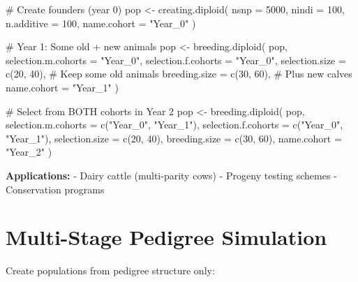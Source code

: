 \documentclass[
  letterpaper,
]{book}
\newenvironment{Shaded}{\begin{snugshade}}{\end{snugshade}}
\newcommand{\AttributeTok}[1]{\textcolor[rgb]{0.40,0.45,0.13}{#1}}
\newcommand{\CommentTok}[1]{\textcolor[rgb]{0.37,0.37,0.37}{#1}}
\newcommand{\DecValTok}[1]{\textcolor[rgb]{0.68,0.00,0.00}{#1}}
\newcommand{\FunctionTok}[1]{\textcolor[rgb]{0.28,0.35,0.67}{#1}}
\newcommand{\NormalTok}[1]{\textcolor[rgb]{0.00,0.23,0.31}{#1}}
\newcommand{\OtherTok}[1]{\textcolor[rgb]{0.00,0.23,0.31}{#1}}
\newcommand{\StringTok}[1]{\textcolor[rgb]{0.13,0.47,0.30}{#1}}
\begin{document}
\begin{Shaded}
\begin{Highlighting}[]
\CommentTok{\# Create founders (year 0)}
\NormalTok{pop }\OtherTok{\textless{}{-}} \FunctionTok{creating.diploid}\NormalTok{(}
  \AttributeTok{nsnp =} \DecValTok{5000}\NormalTok{, }\AttributeTok{nindi =} \DecValTok{100}\NormalTok{,}
  \AttributeTok{n.additive =} \DecValTok{100}\NormalTok{,}
  \AttributeTok{name.cohort =} \StringTok{"Year\_0"}
\NormalTok{)}

\CommentTok{\# Year 1: Some old + new animals}
\NormalTok{pop }\OtherTok{\textless{}{-}} \FunctionTok{breeding.diploid}\NormalTok{(}
\NormalTok{  pop,}
  \AttributeTok{selection.m.cohorts =} \StringTok{"Year\_0"}\NormalTok{,}
  \AttributeTok{selection.f.cohorts =} \StringTok{"Year\_0"}\NormalTok{,}
  \AttributeTok{selection.size =} \FunctionTok{c}\NormalTok{(}\DecValTok{20}\NormalTok{, }\DecValTok{40}\NormalTok{),    }\CommentTok{\# Keep some old animals}
  \AttributeTok{breeding.size =} \FunctionTok{c}\NormalTok{(}\DecValTok{30}\NormalTok{, }\DecValTok{60}\NormalTok{),     }\CommentTok{\# Plus new calves}
  \AttributeTok{name.cohort =} \StringTok{"Year\_1"}
\NormalTok{)}

\CommentTok{\# Select from BOTH cohorts in Year 2}
\NormalTok{pop }\OtherTok{\textless{}{-}} \FunctionTok{breeding.diploid}\NormalTok{(}
\NormalTok{  pop,}
  \AttributeTok{selection.m.cohorts =} \FunctionTok{c}\NormalTok{(}\StringTok{"Year\_0"}\NormalTok{, }\StringTok{"Year\_1"}\NormalTok{),}
  \AttributeTok{selection.f.cohorts =} \FunctionTok{c}\NormalTok{(}\StringTok{"Year\_0"}\NormalTok{, }\StringTok{"Year\_1"}\NormalTok{),}
  \AttributeTok{selection.size =} \FunctionTok{c}\NormalTok{(}\DecValTok{20}\NormalTok{, }\DecValTok{40}\NormalTok{),}
  \AttributeTok{breeding.size =} \FunctionTok{c}\NormalTok{(}\DecValTok{30}\NormalTok{, }\DecValTok{60}\NormalTok{),}
  \AttributeTok{name.cohort =} \StringTok{"Year\_2"}
\NormalTok{)}
\end{Highlighting}
\end{Shaded}

\textbf{Applications:} - Dairy cattle (multi-parity cows) - Progeny
testing schemes - Conservation programs

\section{Multi-Stage Pedigree Simulation}\label{sec-pedigree-simulation}

Create populations from pedigree structure only:
\end{document}
